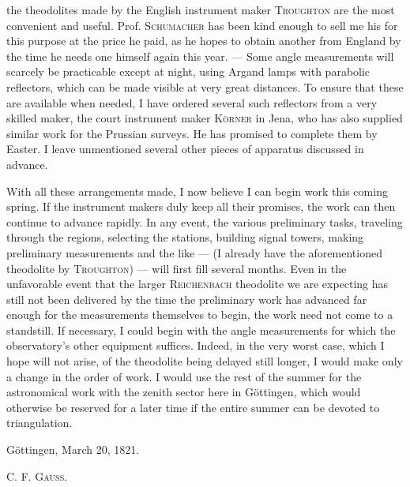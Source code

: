 %
the theodolites made by the English instrument maker \textsc{Troughton} are the most convenient and useful. Prof. \textsc{Schumacher} has been kind enough to sell me his for this purpose at the price he paid, as he hopes to obtain another from England by the time he needs one himself again this year. — Some angle measurements will scarcely be practicable except at night, using Argand lamps with parabolic reflectors, which can be made visible at very great distances. To ensure that these are available when needed, I have ordered several such reflectors from a very skilled maker, the court instrument maker \textsc{Körner} in Jena, who has also supplied similar work for the Prussian surveys. He has promised to complete them by Easter. I leave unmentioned several other pieces of apparatus discussed in advance.

With all these arrangements made, I now believe I can begin work this coming spring. If the instrument makers duly keep all their promises, the work can then continue to advance rapidly. In any event, the various preliminary tasks, traveling through the regions, selecting the stations, building signal towers, making preliminary measurements and the like — (I already have the aforementioned theodolite by \textsc{Troughton}) — will first fill several months. Even in the unfavorable event that the larger \textsc{Reichenbach} theodolite we are expecting has still not been delivered by the time the preliminary work has advanced far enough for the measurements themselves to begin, the work need not come to a standstill. If necessary, I could begin with the angle measurements for which the observatory’s other equipment suffices. Indeed, in the very worst case, which I hope will not arise, of the theodolite being delayed still longer, I would make only a change in the order of work. I would use the rest of the summer for the astronomical work with the zenith sector here in Göttingen, which would otherwise be reserved for a later time if the entire summer can be devoted to triangulation.

Göttingen, March 20, 1821.
\begin{flushright}C. F. \textsc{Gauss}.\end{flushright}

